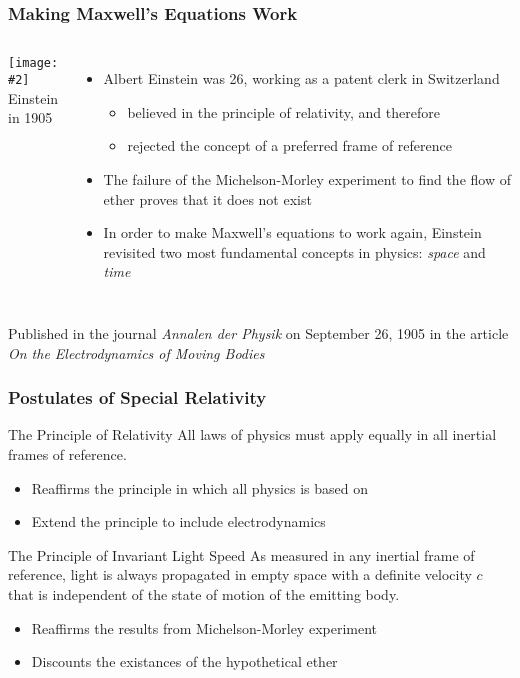 \documentclass[12pt,compress,aspectratio=169]{beamer}
\newcommand{\pic}[2]{\texttt{[image: \#2]}}
\begin{document}
\begin{frame}
  \frametitle{Making Maxwell's Equations Work}
  \begin{columns}
    \pic{1.1}{graphics/Einstein_patentoffice.jpg}\\
    {\footnotesize Einstein in 1905}
  
    \begin{itemize}
    \item Albert Einstein was 26, working as a patent clerk in Switzerland
      \begin{itemize}
      \item believed in the principle of relativity, and therefore
      \item rejected the concept of a preferred frame of reference
      \end{itemize}
    \item The failure of the Michelson-Morley experiment to find the flow of
      ether proves that it does not exist
    \item In order to make Maxwell's equations to work again, Einstein
      revisited two most fundamental concepts in physics: \emph{space} and
      \emph{time}
    \end{itemize}
  \end{columns}

  \vspace{.15in}Published in the journal \emph{Annalen der Physik} on September
  26, 1905 in the article \emph{On the Electrodynamics of Moving Bodies}
\end{frame}


\begin{frame}
  \frametitle{Postulates of Special Relativity}
  \begin{block}{The Principle of Relativity}
    All laws of physics must apply equally in all inertial frames of reference.
  \end{block}
  \begin{itemize}
  \item Reaffirms the principle in which all physics is based on
  \item Extend the principle to include electrodynamics
  \end{itemize}

  \vspace{.1in}
  \begin{block}{The Principle of Invariant Light Speed}
    As measured in any inertial frame of reference, light is always propagated
    in empty space with a definite velocity $c$ that is independent of the
    state of motion of the emitting body.
  \end{block}
  \begin{itemize}
  \item Reaffirms the results from Michelson-Morley experiment
  \item Discounts the existances of the  hypothetical ether
  \end{itemize}
\end{frame}
\end{document}
